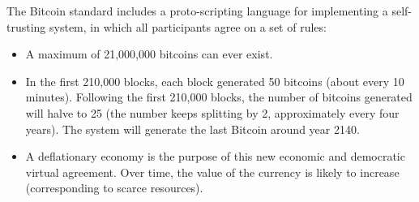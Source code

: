 The Bitcoin standard includes a proto-scripting language for implementing a self-trusting system, in which all participants agree on a set of rules:
\begin{itemize}
    \item A maximum of 21,000,000 bitcoins can ever exist.
    \item In the first 210,000 blocks, each block generated 50 bitcoins (about every 10 minutes).
Following the first 210,000 blocks, the number of bitcoins generated will halve to 25 (the number keeps splitting by 2, approximately every four years). The system will generate the last Bitcoin around year 2140.
    \item A deflationary economy is the purpose of this new economic and democratic virtual agreement. Over time, the value of the currency is likely to increase (corresponding to scarce resources).
 
\end{itemize}





